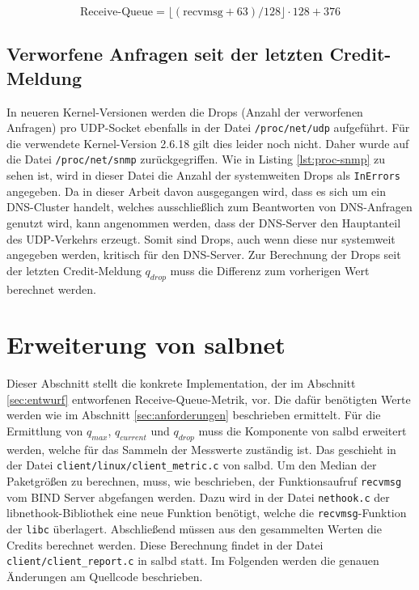 \documentclass[a4paper, 12pt, BCOR10mm, DIV12, toc=bibliography, toc=listof, german]{scrbook}
\begin{document}
		\begin{equation}
			\text{Receive-Queue} = \lfloor (\text{recvmsg} + 63) / 128 \rfloor \cdot 128 + 376
			\label{eq:recvmsg}
		\end{equation}



		\subsection*{Verworfene Anfragen seit der letzten Credit-Meldung} %

		In neueren Kernel-Versionen werden die Drops (Anzahl der verworfenen Anfragen) pro UDP-Socket
		ebenfalls in der Datei \texttt{/proc/net/udp} aufgeführt. Für die verwendete Kernel-Version
		2.6.18 gilt dies leider noch nicht. Daher wurde auf die Datei \texttt{/proc/net/snmp}
		zurückgegriffen. Wie in Listing \ref{lst:proc-snmp} zu sehen ist, wird in dieser Datei die Anzahl
		der systemweiten Drops als \texttt{InErrors} angegeben. Da in dieser Arbeit davon ausgegangen
		wird, dass es sich um ein DNS-Cluster handelt, welches ausschließlich zum Beantworten von
		DNS-Anfragen genutzt wird, kann angenommen werden, dass der DNS-Server den Hauptanteil
		des UDP-Verkehrs erzeugt. Somit sind Drops, auch wenn diese nur systemweit angegeben werden,
		kritisch für den DNS-Server. Zur Berechnung der Drops seit der letzten Credit-Meldung $q_{drop}$
		muss die Differenz zum vorherigen Wert berechnet werden.
		
		




		\section{Erweiterung von salbnet} %
		\label{sec:erweiterung}

		Dieser Abschnitt stellt die konkrete Implementation, der im Abschnitt \ref{sec:entwurf}
		entworfenen Receive-Queue-Metrik, vor. Die dafür benötigten Werte werden wie im Abschnitt
		\ref{sec:anforderungen} beschrieben ermittelt. Für die Ermittlung von $q_{max}$, $q_{current}$
		und $q_{drop}$ muss die Komponente von salbd erweitert werden, welche für das Sammeln der
		Messwerte zuständig ist. Das geschieht in der Datei \texttt{client/linux/client\_metric.c} von
		salbd.  Um den Median der Paketgrößen zu berechnen, muss, wie beschrieben, der Funktionsaufruf
		\texttt{recvmsg} vom BIND Server abgefangen werden. Dazu wird in der Datei \texttt{nethook.c}
		der libnethook-Bibliothek eine neue Funktion benötigt, welche die \texttt{recvmsg}-Funktion der
		\texttt{libc} überlagert. Abschließend müssen aus den gesammelten Werten die Credits berechnet
		werden. Diese Berechnung findet in der Datei \texttt{client/client\_report.c} in salbd statt. Im
		Folgenden werden die genauen Änderungen am Quellcode beschrieben.
\end{document}
